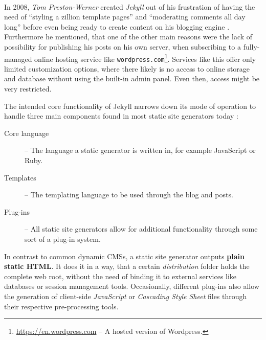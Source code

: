 \paragraph{} %
\label{par:creatingcontent}
In 2008, \emph{Tom Preston-Werner} created \emph{Jekyll} out of his frustration of having the need of ``styling a zillion template pages'' and ``moderating comments all day long'' before even being ready to create content on his blogging engine \cite[]{PrestonWerner2008jekyll}. Furthermore he mentioned, that one of the other main reasons were the lack of possibility for publishing his posts on his own server, when subscribing to a fully-managed online hosting service like \texttt{wordpress.com}\footnote{\url{https://en.wordpress.com} -- A hosted version of Wordpress.}. Services like this offer only limited customization options, where there likely is no access to online storage and database without using the built-in admin panel. Even then, access might be very restricted.

The intended core functionality of Jekyll narrows down its mode of operation to handle three main components found in most static site generators today \cite[24]{dhillon2016}:

\begin{description}
  \item [Core language] -- The language a static generator is written in, for example JavaScript or Ruby.
  \item [Templates] -- The templating language to be used through the blog and posts.
  \item [Plug-ins] -- All static site generators allow for additional functionality through some
sort of a plug-in system.
\end{description}

In contrast to common dynamic CMSs, a static site generator outputs \textbf{plain static HTML}. It does it in a way, that a certain \emph{distribution} folder holds the complete web root, without the need of binding it to external services like databases or session management tools. Occasionally, different plug-ins also allow the generation of client-side \emph{JavaScript} or \emph{Cascading Style Sheet} files through their respective pre-processing tools.




